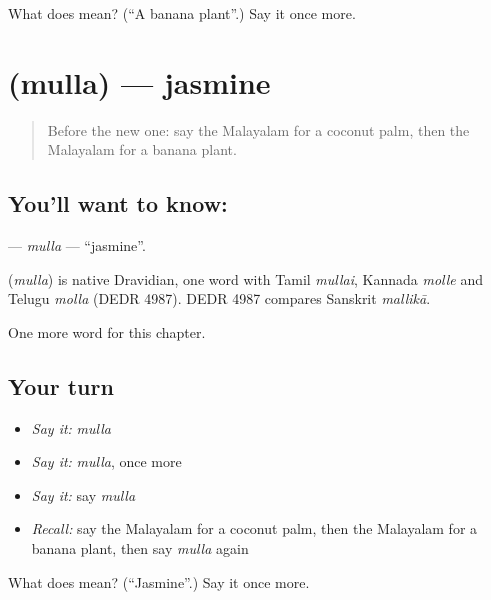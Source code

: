 \begin{tcolorbox}[breakable,colback=teal!4,colframe=teal!35!black,title={Before you move on}]
What does  mean? (\textquotedblleft{}A banana plant\textquotedblright{}.) Say it once more.
\end{tcolorbox}
\section[\texorpdfstring{\ml{മുല്ല} (mulla)}{മുല്ല (mulla)}]{ (mulla) — jasmine}

\label{lesson:ML-C161-mulla}



\begin{quote}
Before the new one: say the Malayalam for a coconut palm, then the Malayalam for a banana plant.
\end{quote}

\subsection*{You'll want to know: }
\textbf{} — \emph{mulla} — \textquotedblleft{}jasmine\textquotedblright{}.

\begin{cousinweb}
\textbf{} (\emph{mulla}) is native Dravidian, one word with Tamil \emph{mullai}, Kannada \emph{molle} and Telugu \emph{molla} (DEDR 4987). DEDR 4987 compares Sanskrit \emph{mallikā}.
\end{cousinweb}

\begin{grammarlens}[title={What you've built}]
One more word for this chapter.
\end{grammarlens}

\subsection*{Your turn}
\begin{itemize}
\raggedright
  \item \emph{Say it:} \emph{mulla}
  \item \emph{Say it:} \emph{mulla}, once more
  \item \emph{Say it:} say \emph{mulla}
  \item \emph{Recall:} say the Malayalam for a coconut palm, then the Malayalam for a banana plant, then say \emph{mulla} again
\end{itemize}

\begin{tcolorbox}[breakable,colback=teal!4,colframe=teal!35!black,title={Before you move on}]
What does  mean? (\textquotedblleft{}Jasmine\textquotedblright{}.) Say it once more.
\end{tcolorbox}
